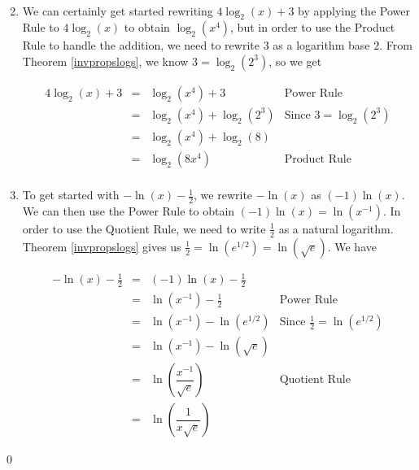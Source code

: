 \begin{ex}
\begin{enumerate}
\[\begin{array}{rclr}
                            
\end{array}\]
\setlength{\extrarowheight}{2pt}

\item  We can certainly get started rewriting $4\log_{2}(x) + 3$ by applying the Power Rule to  $4\log_{2}(x)$ to obtain $\log_{2}\left(x^4\right)$, but in order to use the Product Rule to handle the addition, we need to rewrite $3$ as a logarithm base $2$.  From Theorem \ref{invpropslogs}, we know $3 = \log_{2}\left(2^3\right)$, so we get

\setlength{\extrarowheight}{4pt}
\[ \begin{array}{rclr}

4\log_{2}(x) + 3 & = & \log_{2}\left(x^4\right) + 3  & \mbox{Power Rule} \\ 
                             & = & \log_{2}\left(x^4\right) + \log_{2}\left(2^3\right)& \mbox{Since $3 = \log_{2}\left(2^3\right)$} \\
                             & = & \log_{2}\left(x^4\right) + \log_{2}(8)& \\
                             & = & \log_{2}\left( 8x^4\right) & \mbox{Product Rule} \\
                             
                            
\end{array}\]
\setlength{\extrarowheight}{2pt}

\item To get started with $-\ln(x) - \frac{1}{2}$, we rewrite  $-\ln(x)$ as $(-1) \ln(x)$.  We can then use the Power Rule to obtain $(-1)\ln(x) = \ln\left(x^{-1}\right)$. In order to use the Quotient Rule, we need to write $\frac{1}{2}$ as a natural logarithm. Theorem \ref{invpropslogs} gives us $\frac{1}{2} = \ln\left(e^{1/2}\right) = \ln\left(\sqrt{e}\right)$.  We have 

\setlength{\extrarowheight}{6pt}
\[ \begin{array}{rclr}

-\ln(x) - \frac{1}{2} & = & (-1)\ln(x) - \frac{1}{2}  &  \\ 
                             & = & \ln\left(x^{-1}\right) - \frac{1}{2} & \mbox{Power Rule} \\
                             & = & \ln\left(x^{-1}\right) - \ln\left(e^{1/2}\right)& \mbox{Since $\frac{1}{2} = \ln\left(e^{1/2}\right)$} \\
                             & = & \ln\left(x^{-1}\right) - \ln\left(\sqrt{e} \right)& \\ [6pt]
                             & = & \ln\left(\dfrac{x^{-1}}{\sqrt{e}}\right) & \mbox{Quotient Rule} \\ [10pt]
                             & = & \ln\left(\dfrac{1}{x\sqrt{e}}\right) &
\end{array}\]
\setlength{\extrarowheight}{2pt}

\end{enumerate}

\vspace{-.3in} \qed

\end{ex}

